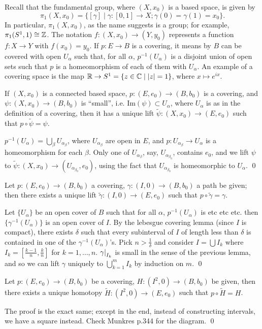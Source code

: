 \noindent Recall that the fundamental group, where $(X, x_0)$ is a based space, is given by
\[ \pi_1(X, x_0) = \{[\gamma] \mid \gamma : [0, 1] \to X; \gamma(0) = \gamma(1) = x_0 \}. \]
In particular, $\pi_1(X, x_0)$, as the name suggests is a group; for example, $\pi_1(S^1, 1) \cong \mathbb Z$. The notation $f : (X, x_0) \to (Y, y_0)$ represents a function $f : X \to Y$ with $f(x_0) = y_0$. If $p : E \to B$ is a covering, it means by $B$ can be covered with open $U_\alpha$ such that, for all $\alpha$, $p^{-1}(U_\alpha)$ is a disjoint union of open sets such that $p$ is a homeomorphism of each of them with $U_\alpha$.
\medskip\newline
An example of a covering space is the map $\mathbb R \to S^1 = \{z \in \mathbb C \mid \left\lvert z \right\rvert = 1\}$, where $x \mapsto e^{ix}$.
\begin{simplelemma}
    If $(X, x_0)$ is a connected based space, $p : (E, e_0) \to (B, b_0)$ is a covering, and $\psi : (X, x_0) \to (B, b_0)$ is ``small'', i.e. $\mathrm{Im} (\psi) \subset U_\alpha$, where $U_\alpha$ is as in the definition of a covering, then it has a unique lift $\tilde{\psi} : (X, x_0) \to (E, e_0)$ such that $p \circ \tilde{\psi} = \psi$.
\end{simplelemma}
\noindent $p^{-1}(U_\alpha) = \bigcup_\beta U_{\alpha_\beta}$, where $U_{\alpha_\beta}$ are open in $E$, and $p : U_{\alpha_\beta} \to U_\alpha$ is a homeomorphism for each $\beta$. Only one of $U_{\alpha_\beta}$, say, $U_{\alpha_{\beta_0}}$, contains $e_0$, and we lift $\psi$ to $\tilde{\psi} : (X, x_0) \to (U_{\alpha_{\beta_0}}, e_0)$, using the fact that $U_{\alpha_{\beta_0}}$ is homeomorphic to $U_\alpha$. \qed
\begin{simplethm}
    Let $p : (E, e_0) \to (B, b_0)$ a covering, $\gamma : (I, 0) \to (B, b_0)$ a path be given; then there exists a unique lift $\tilde{\gamma} : (I, 0) \to (E, e_0)$ such that $p \circ \tilde{\gamma} = \gamma$.
\end{simplethm}
\noindent Let $\{U_\alpha\}$ be an open cover of $B$ such that for all $\alpha$, $p^{-1}(U_\alpha)$ is etc etc etc. then $\{\gamma^{-1}(U_\alpha)\}$ is an open cover of $I$. By the lebesgue covering lemma (since $I$ is compact), there exists $\delta$ such that every subinterval of $I$ of length less than $\delta$ is contained in one of the $\gamma^{-1}(U_\alpha)$'s. Pick $n > \frac{1}{\delta}$ and consider $I = \bigcup I_k$ where $I_k = [\frac{k-1}{n}, \frac{k}{n}]$ for $k = 1, \dots, n$. $\restr{\gamma}{I_k}$ is small in the sense of the previous lemma, and so we can lift $\gamma$ uniquely to $\bigcup_{k=1}^m I_k$ by induction on $m$. \qed

\begin{simplethm}
    Let $p : (E, e_0) \to (B, b_0)$ be a covering, $H : (I^2, 0) \to (B, b_0)$ be given, then there exists a unique homotopy $\tilde{H} : (I^2, 0) \to (E, e_0)$ such that $p \circ \tilde{H} = H$.
\end{simplethm}
\noindent The proof is the exact same; except in the end, instead of constructing intervals, we have a square instead. Check Munkres p.344 for the diagram. \qed